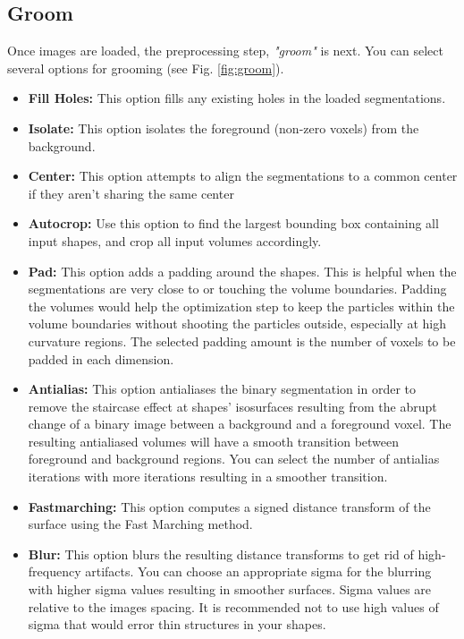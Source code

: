 \documentclass[letterpaper,12pt]{article}   %
\begin{document}
\subsection{Groom}

Once images are loaded, the preprocessing step, \textit{"groom"} is next. You can select several options for grooming (see Fig. \ref{fig:groom}).

\begin{itemize}
\item \textbf{Fill Holes:} This option fills any existing holes in the loaded segmentations.

\item \textbf{Isolate:} This option isolates the foreground (non-zero voxels) from the background.

\item \textbf{Center:} This option attempts to align the segmentations to a common center if they aren't sharing the same center

\item \textbf{Autocrop:} Use this option to find the largest bounding box containing all input shapes, and crop all input volumes accordingly.

\item \textbf{Pad:} This option adds a padding around the shapes. This is helpful when the segmentations are very close to or touching the volume boundaries. Padding the volumes would help the optimization step to keep the particles within the volume boundaries without shooting the particles outside, especially at high curvature regions. The selected padding amount is the number of voxels to be padded in each dimension.

\item \textbf{Antialias:} This option antialiases the binary segmentation in order to remove the staircase effect at shapes' isosurfaces resulting from the abrupt change of a binary image between a background and a foreground voxel. The resulting antialiased volumes will have a smooth transition between foreground and background regions. You can select the number of antialias iterations with more iterations resulting in a smoother transition.

\item \textbf{Fastmarching:} This option computes a signed distance transform of the surface using the Fast Marching method.

\item \textbf{Blur:} This option blurs the resulting distance transforms to get rid of high-frequency artifacts. You can choose an appropriate sigma for the blurring with higher sigma values resulting in smoother surfaces. Sigma values are relative to the images spacing. It is recommended not to use high values of sigma that would error thin structures in your shapes.


\end{itemize}
\end{document}
